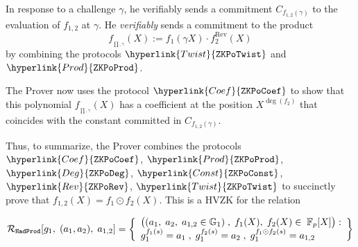 \documentclass[11pt, lettersize, notitlepage, leqno, footskip=0.6cm]{article}
\newcommand{\bFp}{\mathbb{F}_p}
\newcommand{\mc}{\mathcal}
\newcommand{\mb}{\mathbb}
\newcommand{\mr}{\mathrm}
\newcommand{\vs}{\vspace{-0.15cm}}
\newcommand{\op}{overwhelming probability}
\numberwithin{equation}{section}
\begin{document}
In response to a challenge $\gamma$, he verifiably sends a commitment $C_{f_{1,2}(\gamma)}$ to the evaluation of $f_{1,2}$ at $\gamma$. He \textit{verifiably} sends a commitment to the product \vs $$f_{_{\prod,\gamma}}(X):= f_1(\gamma X)\cdot f_2^{\mr{Rev}}(X)  $$ by combining the protocols $\hyperlink{Twist}{\tt{ZKPoTwist}}$ and $\hyperlink{Prod}{\tt{ZKPoProd}}$. 

The Prover now uses the protocol $\hyperlink{Coef}{\tt{ZKPoCoef}}$ to show that this polynomial $f_{_{\prod,\gamma}}(X)$ has a coefficient at the position $X^{\deg(f_2)}$ that coincides with the constant committed in $C_{f_{1,2}(\gamma)}$.

\begin{comment}


For three committed polynomials $f_1(X)$, $f_2(X)$, $f_{1,2}(X)$ and their commitments \vs $$a_1 = g_1^{f_1(s)}  \;\;,\;\; a_2  = g_1^{f_2(s)} \;\;,\;\; a_{1,2}:= g_1^{f_{1,2}(s)},$$ if a Prover can demonstrate that for a randomly generated challenge $\gamma$, the evaluation $f_{1,2}(\gamma)$ coincides with the coefficient of $f_{_{\prod,\gamma}}(X)$ at 
$X^{\deg(f_2)}$, it implies that with \op, $f_{1,2}(X)$ is the Hadamard product $f_1\odot f_2(X)$. \end{comment}





Thus, to summarize, the Prover combines the protocols $\hyperlink{Coef}{\tt{ZKPoCoef}}$, $\hyperlink{Prod}{\tt{ZKPoProd}}$,  $\hyperlink{Deg}{\tt{ZKPoDeg}}$, $\hyperlink{Const}{\tt{ZKPoConst}}$, $\hyperlink{Rev}{\tt{ZKPoRev}}$, $\hyperlink{Twist}{\tt{ZKPoTwist}}$ to succinctly prove that $f_{1,2}(X) = f_1\odot f_2(X)$. This is a HVZK for the relation 

\vspace{-3mm} $$\mc{R}_{\tt{HadProd}}[g_1,\;(a_1,a_2),\; a_{1,2}] = \left\{\begin{array}{l} \big((a_1,\;a_2,\; a_{1,2}\in\mb{G}_1)\;,\; f_1(X),\;f_2(X)\in\; \bFp[X]\big):\\ g_1^{f_1(s)} = a_1\;,\; g_1^{f_2(s)} = a_2 \;,\; g_1^{f_1\odot f_2(s)} = a_{1,2}\end{array} \right\} \vs $$





\bigskip
\end{document}
